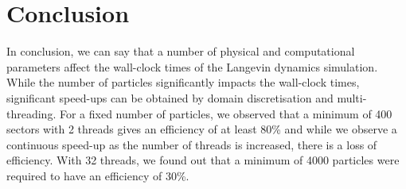 \documentclass[11pt, oneside]{article}
\begin{document}
                
\section{Conclusion}
     In conclusion, we can say that a number of physical and computational parameters affect the wall-clock times of the Langevin dynamics simulation. While the number of particles significantly impacts the wall-clock times, significant speed-ups can be obtained by domain discretisation and multi-threading. For a fixed number of particles, we observed that a minimum of 400 sectors with 2 threads gives an efficiency of at least 80\% and while we observe a continuous speed-up as the number of threads is increased, there is a loss of efficiency. With 32 threads, we found out that a minimum of 4000 particles were required to have an efficiency of 30\%.         



\end{document}
